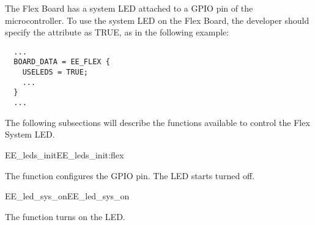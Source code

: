 The Flex Board has a system LED attached to a GPIO pin of the
microcontroller. To use the system LED on the Flex Board, the
developer should specify the  attribute as TRUE, as in
the following example:

\begin{lstlisting}
  ...
  BOARD_DATA = EE_FLEX {
    USELEDS = TRUE;
    ...
  }
  ...
\end{lstlisting}

The following subsections will describe the functions available to
control the Flex System LED.

\begin{function_nopb2}{EE\_leds\_init}{EE_leds_init:flex}
  
  \begin{fundescription}
    The function configures the GPIO pin. The LED starts turned off.
  \end{fundescription}
  
  
  
\end{function_nopb2}

\begin{function_nopb2}{EE\_led\_sys\_on}{EE_led_sys_on}
  
  \begin{fundescription}
    The function turns on the LED.
  \end{fundescription}
  
  
  
\end{function_nopb2}

